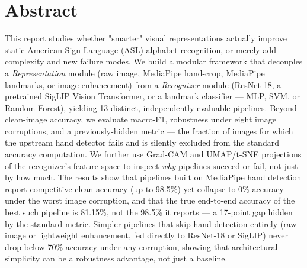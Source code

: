 \documentclass[11pt,a4paper]{article}
\begin{document}
\tableofcontents
\newpage
{}

\section*{Abstract}
\noindent\colorbox{hustbluelight}{%
  \begin{minipage}{\dimexpr\textwidth-2\fboxsep\relax}
    \vspace{6pt}\small
    This report studies whether "smarter" visual representations actually improve
    static American Sign Language (ASL) alphabet recognition, or merely add
    complexity and new failure modes. We build a modular framework that decouples
    a \emph{Representation} module (raw image, MediaPipe hand-crop, MediaPipe
    landmarks, or image enhancement) from a \emph{Recognizer} module (ResNet-18,
    a pretrained SigLIP Vision Transformer, or a landmark classifier --- MLP, SVM,
    or Random Forest), yielding 13 distinct, independently evaluable pipelines.
    Beyond clean-image accuracy, we evaluate macro-F1, robustness under eight
    image corruptions, and a previously-hidden metric --- the fraction of images
    for which the upstream hand detector fails and is silently excluded from the
    standard accuracy computation. We further use Grad-CAM and UMAP/t-SNE
    projections of the recognizer's feature space to inspect \emph{why} pipelines
    succeed or fail, not just by how much.
    The results show that pipelines built on MediaPipe hand detection report
    competitive clean accuracy (up to 98.5\%) yet collapse to 0\% accuracy under
    the worst image corruption, and that the true end-to-end accuracy of the best
    such pipeline is 81.15\%, not the 98.5\% it reports --- a 17-point gap hidden
    by the standard metric. Simpler pipelines that skip hand detection entirely
    (raw image or lightweight enhancement, fed directly to ResNet-18 or SigLIP)
    never drop below 70\% accuracy under any corruption, showing that architectural
    simplicity can be a robustness advantage, not just a baseline.
    \vspace{6pt}
  \end{minipage}}
\vspace{1em}

\end{document}
